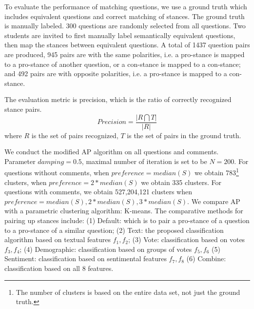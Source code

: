 \documentclass{llncs}
\begin{document}
To evaluate the performance of matching questions, we use a ground truth which includes equivalent questions and correct matching of stances. The ground truth is manually labeled. 300 questions are randomly selected  from all questions. Two students are invited to first manually label semantically equivalent questions, then map the stances between equivalent questions. A total of 1437 question pairs are produced,  945 pairs are with the same polarities, i.e. a pro-stance is mapped to a pro-stance of another question, or a con-stance is mapped to a con-stance; and  492 pairs are with opposite polarities, i.e. a pro-stance is mapped to a con-stance.

The evaluation metric is precision, which is the ratio of correctly recognized stance pairs. 
\begin{equation}
Precision = \frac{|R\bigcap T|}{|R|}
\end{equation}
where $R$ is the set of pairs recognized, $T$ is the set of pairs in the ground truth.

We conduct the modified AP algorithm on all questions and comments. Parameter $damping=0.5$, maximal number of iteration is set to be $N=200$. For questions without comments, when $preference=median(S)$ we obtain 783\footnote{The number of clusters is based on the entire data set, not just the ground truth.} clusters, when $preference=2*median(S)$ we obtain 335 clusters. For questions with comments, we obtain 527,204,121 clusters when $preference=median(S),2*median(S),3*median(S)$. We compare AP with a parametric clustering algorithm: K-means. The comparative methods for pairing up stances include: (1) Default: which is to pair a pro-stance of a question to a pro-stance of a similar question; (2) Text: the proposed classification algorithm based on textual features $f_1,f_2$; (3) Vote: classification based on votes $f_3,f_4$; (4) Demographic: classification based on groups of votes $f_5,f_6$ (5) Sentiment: classification based on sentimental features $f_7,f_8$ (6) Combine: classification based on all 8 features.
\end{document}
